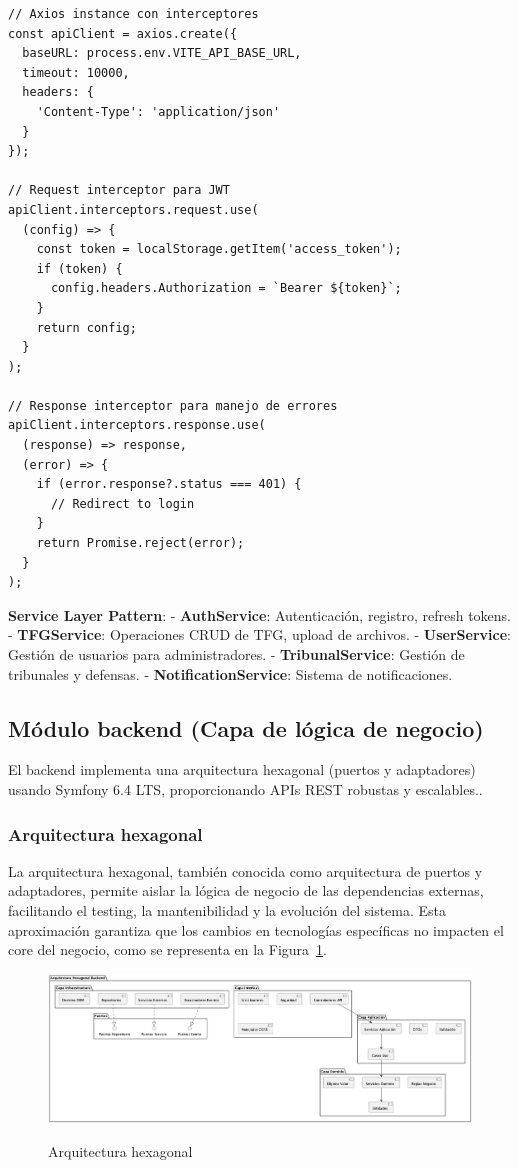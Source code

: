 \documentclass[12pt,a4paper,oneside]{report}
\providecommand{\pandocbounded}[1]{#1}
\begin{document}
\begin{lstlisting}
// Axios instance con interceptores
const apiClient = axios.create({
  baseURL: process.env.VITE_API_BASE_URL,
  timeout: 10000,
  headers: {
    'Content-Type': 'application/json'
  }
});

// Request interceptor para JWT
apiClient.interceptors.request.use(
  (config) => {
    const token = localStorage.getItem('access_token');
    if (token) {
      config.headers.Authorization = `Bearer ${token}`;
    }
    return config;
  }
);

// Response interceptor para manejo de errores
apiClient.interceptors.response.use(
  (response) => response,
  (error) => {
    if (error.response?.status === 401) {
      // Redirect to login
    }
    return Promise.reject(error);
  }
);
\end{lstlisting}

\textbf{Service Layer Pattern}: - \textbf{AuthService}: Autenticación,
registro, refresh tokens. - \textbf{TFGService}: Operaciones CRUD de
TFG, upload de archivos. - \textbf{UserService}: Gestión de usuarios
para administradores. - \textbf{TribunalService}: Gestión de tribunales
y defensas. - \textbf{NotificationService}: Sistema de notificaciones.

\subsection{Módulo backend (Capa de lógica de
negocio)}\label{muxf3dulo-backend-capa-de-luxf3gica-de-negocio}

El backend implementa una arquitectura hexagonal (puertos y adaptadores)
usando Symfony 6.4 LTS, proporcionando APIs REST robustas y escalables..

\subsubsection{Arquitectura hexagonal}\label{arquitectura-hexagonal}

La arquitectura hexagonal, también conocida como arquitectura de puertos y adaptadores, permite aislar la lógica de negocio de las dependencias externas, facilitando el testing, la mantenibilidad y la evolución del sistema. Esta aproximación garantiza que los cambios en tecnologías específicas no impacten el core del negocio, como se representa en la Figura~\ref{fig:arquitectura-hexagonal}.

\begin{figure}[H]
\centering
\pandocbounded{\includegraphics[keepaspectratio,alt={Arquitectura hexagonal}]{processed/images/05_diseno_plantuml_1.png}}
\caption{Arquitectura hexagonal}
\label{fig:arquitectura-hexagonal}
\end{figure}
\end{document}
